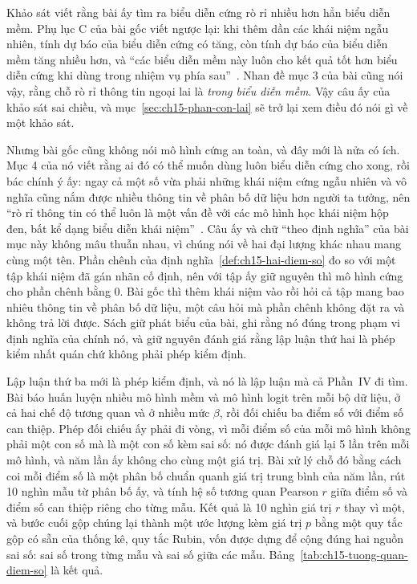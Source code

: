 Khảo sát viết rằng bài ấy tìm ra biểu diễn cứng rò rỉ nhiều hơn hẳn biểu diễn
mềm. Phụ lục C của bài gốc viết ngược lại: khi thêm dần các khái niệm ngẫu nhiên,
tính dự báo của biểu diễn cứng có tăng, còn tính dự báo của biểu diễn mềm tăng
nhiều hơn, và \enquote{các biểu diễn mềm này luôn cho kết quả tốt hơn biểu diễn
cứng khi dùng trong nhiệm vụ phía sau}~\autocite{mclm}. Nhan đề mục 3 của bài
cũng nói vậy, rằng chỗ rò rỉ thông tin ngoại lai là \emph{trong biểu diễn mềm}.
Vậy câu ấy của khảo sát sai chiều, và mục~\ref{sec:ch15-phan-con-lai} sẽ trở lại
xem điều đó nói gì về một khảo sát.

%
Nhưng bài gốc cũng không nói mô hình cứng an toàn, và đây mới là nửa có ích. Mục
4 của nó viết rằng ai đó có thể muốn dùng luôn biểu diễn cứng cho xong, rồi bác
chính ý ấy: ngay cả một số vừa phải những khái niệm cứng ngẫu nhiên và vô nghĩa
cũng nắm được nhiều thông tin về phân bố dữ liệu hơn người ta tưởng, nên
\enquote{rò rỉ thông tin có thể luôn là một vấn đề với các mô hình học khái niệm
hộp đen, bất kể dạng biểu diễn khái niệm}~\autocite{mclm}. Câu ấy và chữ
\enquote{theo định nghĩa} của bài mục này không mâu thuẫn nhau, vì chúng nói về
hai đại lượng khác nhau mang cùng một tên. Phần chênh của
định nghĩa~\ref{def:ch15-hai-diem-so} đo so với một tập khái niệm đã gán nhãn cố
định, nên với tập ấy giữ nguyên thì mô hình cứng cho phần chênh bằng 0. Bài gốc
thì thêm khái niệm vào rồi hỏi cả tập mang bao nhiêu thông tin về phân bố dữ
liệu, một câu hỏi mà phần chênh không đặt ra và không trả lời được. Sách giữ
phát biểu của bài, ghi rằng nó đúng trong phạm vi định nghĩa của chính nó, và
giữ nguyên đánh giá rằng lập luận thứ hai là phép kiểm nhất quán chứ không phải
phép kiểm định.

%
Lập luận thứ ba mới là phép kiểm định, và nó là lập luận mà cả Phần~IV đi tìm.
Bài báo huấn luyện nhiều mô hình mềm và mô hình logit trên mỗi bộ dữ liệu, ở cả
hai chế độ tương quan và ở nhiều mức $\beta$, rồi đối chiếu ba điểm số với
điểm số can thiệp. Phép đối chiếu ấy phải đi vòng, vì mỗi điểm số của mỗi mô
hình không phải một con số mà là một con số kèm sai số: nó được đánh giá lại 5
lần trên mỗi mô hình, và năm lần ấy không cho cùng một giá trị. Bài xử lý chỗ đó
bằng cách coi mỗi điểm số là một phân bố chuẩn quanh giá trị trung bình của năm
lần, rút 10 nghìn mẫu từ phân bố ấy, và tính hệ số tương quan Pearson $r$ giữa
điểm số và điểm số can thiệp riêng cho từng mẫu. Kết quả là 10 nghìn giá trị $r$
thay vì một, và bước cuối gộp chúng lại thành một ước lượng kèm giá trị $p$ bằng
một quy tắc gộp có sẵn của thống kê, quy tắc Rubin, vốn được dựng để cộng đúng
hai nguồn sai số: sai số trong từng mẫu và sai số giữa các mẫu.
Bảng~\ref{tab:ch15-tuong-quan-diem-so} là kết quả.

